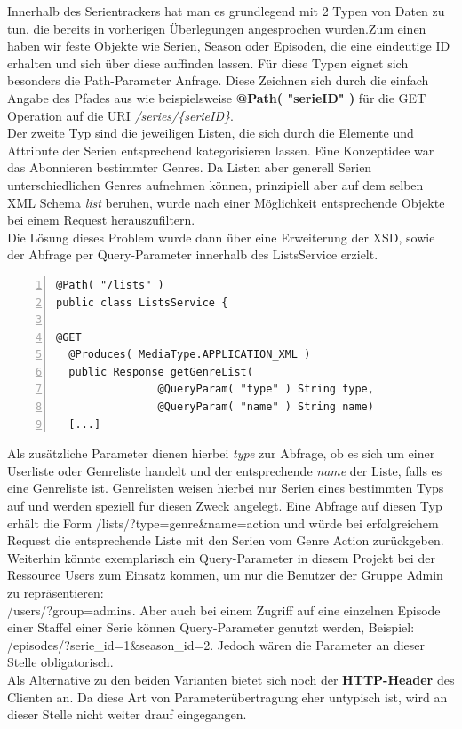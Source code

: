 Innerhalb des Serientrackers hat man es grundlegend mit 2 Typen von Daten zu tun, die bereits in vorherigen Überlegungen angesprochen wurden.Zum einen haben wir feste Objekte wie Serien, Season oder Episoden, die eine eindeutige ID erhalten und sich über diese auffinden lassen. Für diese Typen eignet sich besonders die Path-Parameter Anfrage.
Diese Zeichnen sich durch die einfach Angabe des Pfades aus wie beispielsweise \textbf{@Path( "{serieID}" )} für die GET Operation auf die URI \textit{/series/\{serieID\}}.\\
Der zweite Typ sind die jeweiligen Listen, die sich durch die Elemente und Attribute der Serien entsprechend kategorisieren lassen. Eine Konzeptidee war das Abonnieren bestimmter Genres. Da Listen aber generell Serien unterschiedlichen Genres aufnehmen können, prinzipiell aber auf dem selben XML Schema \textit{list} beruhen, wurde nach einer Möglichkeit entsprechende Objekte bei einem Request herauszufiltern.\\ Die Lösung dieses Problem wurde dann über eine Erweiterung der XSD, sowie der Abfrage per Query-Parameter innerhalb des ListsService erzielt.
\newpage
\begin{lstlisting}[basicstyle=\ttfamily,numbers=left,numberstyle=\footnotesize\ttfamily,backgroundcolor=\color{source},label=listsservice,caption=Auszug aus ListsService mit QueryParam]
@Path( "/lists" )
public class ListsService {

@GET
  @Produces( MediaType.APPLICATION_XML )
  public Response getGenreList(
                @QueryParam( "type" ) String type,
                @QueryParam( "name" ) String name)
  [...]
\end{lstlisting}

Als zusätzliche Parameter dienen hierbei \textit{type} zur Abfrage, ob es sich um einer Userliste oder Genreliste handelt und der entsprechende \textit{name} der Liste, falls es eine Genreliste ist.
Genrelisten weisen hierbei nur Serien eines bestimmten Typs auf und werden speziell für diesen Zweck angelegt. Eine Abfrage auf diesen Typ erhält die Form \textsf{/lists/?type=genre\&name=action} und würde bei erfolgreichem Request die entsprechende Liste mit den Serien vom Genre Action zurückgeben.
\\
Weiterhin könnte exemplarisch  ein Query-Parameter in diesem Projekt bei der Ressource Users zum Einsatz kommen, um nur die Benutzer der Gruppe Admin zu repräsentieren:\\ \textsf{/users/?group=admins}. Aber auch bei einem Zugriff auf eine einzelnen Episode einer Staffel einer Serie können Query-Parameter genutzt werden, Beispiel: \textsf{/episodes/?serie\_id=1\&season\_id=2}. Jedoch wären die Parameter an dieser Stelle obligatorisch.
\\
Als Alternative zu den beiden Varianten bietet sich noch der \textbf{HTTP-Header} des Clienten an. Da diese Art von Parameterübertragung eher untypisch ist, wird an dieser Stelle nicht weiter drauf eingegangen.

